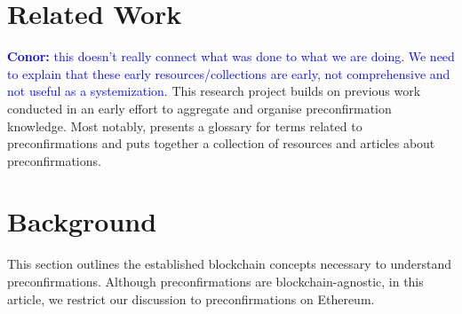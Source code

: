 \documentclass[a4paper]{article}
\theoremstyle{boldstyle}
\newcommand{\cm}[1]{\textcolor{blue}{\textbf{Conor:} #1}}
\newcommand{\todoqb}[1]{\todo[color=red!40]{\textbf{Quentin:} #1}}
\begin{document}
\section{Related Work}

\cm{this doesn't really connect what was done to what we are doing. We need to explain that these early resources/collections are early, not comprehensive and not useful as a systemization.}
This research project builds on previous work conducted in an early effort to aggregate and organise preconfirmation knowledge. Most notably, \cite{W:PreconfirmationsGlossaryRequirements} presents a glossary for terms related to preconfirmations  and \cite{W:AwesomeBasedPreconfirmations} puts together a collection of resources and articles about preconfirmations.


\section{Background} 
\label{sec:background}
This section outlines the established blockchain concepts necessary to understand preconfirmations. Although preconfirmations are blockchain-agnostic, in this article, we restrict our discussion to preconfirmations on Ethereum.
\end{document}
